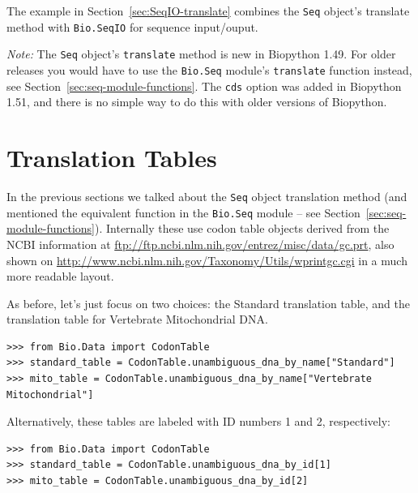 \documentclass{report}
\begin{document}
The example in Section~\ref{sec:SeqIO-translate} combines the \verb|Seq| object's
translate method with \verb|Bio.SeqIO| for sequence input/ouput.

\emph{Note:} The \verb|Seq| object's \verb|translate| method is new in Biopython 1.49.
For older releases you would have to use the \verb|Bio.Seq| module's \verb|translate|
function instead, see Section~\ref{sec:seq-module-functions}. The \texttt{cds} option
was added in Biopython 1.51, and there is no simple way to do this with older versions
of Biopython.

\section{Translation Tables}

In the previous sections we talked about the \verb|Seq| object translation method (and mentioned the equivalent function in the \verb|Bio.Seq| module -- see
Section~\ref{sec:seq-module-functions}).
Internally these use codon table objects derived from the NCBI information at
\url{ftp://ftp.ncbi.nlm.nih.gov/entrez/misc/data/gc.prt}, also shown on
\url{http://www.ncbi.nlm.nih.gov/Taxonomy/Utils/wprintgc.cgi} in a much more readable layout.

As before, let's just focus on two choices: the Standard translation table, and the
translation table for Vertebrate Mitochondrial DNA. 

\begin{verbatim}
>>> from Bio.Data import CodonTable
>>> standard_table = CodonTable.unambiguous_dna_by_name["Standard"]
>>> mito_table = CodonTable.unambiguous_dna_by_name["Vertebrate Mitochondrial"]
\end{verbatim}

Alternatively, these tables are labeled with ID numbers 1 and 2, respectively:
\begin{verbatim}
>>> from Bio.Data import CodonTable
>>> standard_table = CodonTable.unambiguous_dna_by_id[1]
>>> mito_table = CodonTable.unambiguous_dna_by_id[2]
\end{verbatim}
\end{document}
